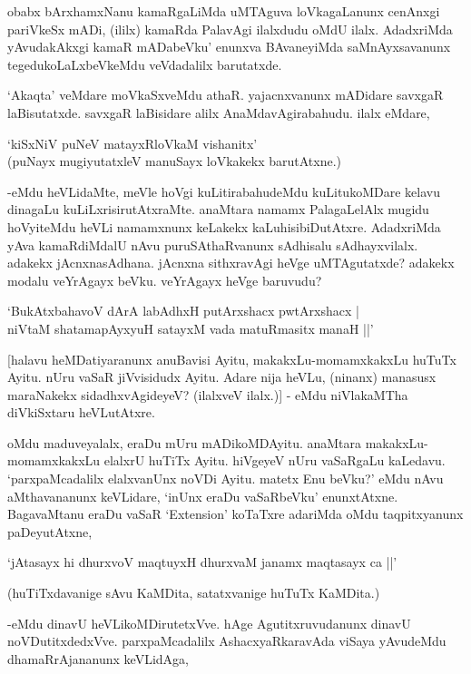 obabx bArxhamxNanu kamaRgaLiMda uMTAguva loVkagaLanunx cenAnxgi pariVkeSx mADi, (ililx) kamaRda PalavAgi ilalxdudu oMdU ilalx. AdadxriMda yAvudakAkxgi kamaR mADabeVku' enunxva BAvaneyiMda saMnAyxsavanunx tegedukoLaLxbeVkeMdu veVdadalilx barutatxde.

`Akaqta' veMdare moVkaSxveMdu athaR. yajacnxvanunx mADidare savxgaR laBisutatxde. savxgaR laBisidare alilx AnaMdavAgirabahudu. ilalx eMdare,

\begin{shloka}
`kiSxNiV puNeV matayxRloVkaM vishanitx'\\
(puNayx mugiyutatxleV manuSayx loVkakekx barutAtxne.)
\end{shloka}

-eMdu heVLidaMte, meVle hoVgi kuLitirabahudeMdu kuLitukoMDare kelavu dinagaLu kuLiLxrisirutAtxraMte. anaMtara namamx PalagaLelAlx mugidu hoVyiteMdu heVLi namamxnunx keLakekx kaLuhisibiDutAtxre. AdadxriMda yAva kamaRdiMdalU nAvu puruSAthaRvanunx sAdhisalu sAdhayxvilalx. adakekx jAcnxnasAdhana. jAcnxna sithxravAgi heVge uMTAgutatxde? adakekx modalu veYrAgayx beVku. veYrAgayx heVge baruvudu?

\begin{shloka}
`BukAtxbahavoV dArA labAdhxH putArxshacx pwtArxshacx |\\
niVtaM shatamapAyxyuH satayxM vada matuRmasitx manaH ||'
\end{shloka}

[halavu heMDatiyaranunx anuBavisi Ayitu, makakxLu-momamxkakxLu huTuTx Ayitu. nUru vaSaR jiVvisidudx Ayitu. Adare nija heVLu, (ninanx) manasusx maraNakekx sidadhxvAgideyeV? (ilalxveV ilalx.)] - eMdu niVlakaMTha diVkiSxtaru heVLutAtxre.

oMdu maduveyalalx, eraDu mUru mADikoMDAyitu. anaMtara makakxLu-momamxkakxLu elalxrU huTiTx Ayitu. hiVgeyeV nUru vaSaRgaLu kaLedavu. `parxpaMcadalilx elalxvanUnx noVDi Ayitu. matetx Enu beVku?' eMdu nAvu aMthavananunx keVLidare, `inUnx eraDu vaSaRbeVku' enunxtAtxne. BagavaMtanu eraDu vaSaR `{\eng Extension}' koTaTxre adariMda oMdu taqpitxyanunx paDeyutAtxne,

\begin{shloka}
`jAtasayx hi dhurxvoV maqtuyxH dhurxvaM janamx maqtasayx ca ||'
\end{shloka}

(huTiTxdavanige sAvu KaMDita, satatxvanige huTuTx KaMDita.)

-eMdu dinavU heVLikoMDirutetxVve. hAge Agutitxruvudanunx dinavU noVDutitxdedxVve. parxpaMcadalilx AshacxyaRkaravAda viSaya yAvudeMdu dhamaRrAjananunx keVLidAga,

